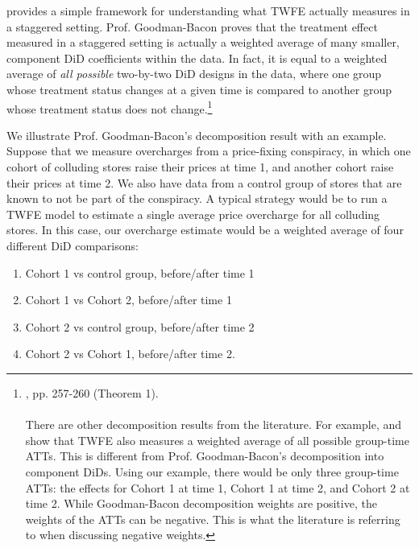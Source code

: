 \documentclass[12pt]{article}
\begin{document}
\citet{goodman-bacon2021a} provides a simple framework for understanding what TWFE actually measures in a staggered setting. Prof. Goodman-Bacon proves that the treatment effect measured in a staggered setting is actually a weighted average of many smaller, component DiD coefficients within the data. In fact, it is equal to a weighted average of \textit{all possible} two-by-two DiD designs in the data, where one group whose treatment status changes at a given time is compared to another group whose treatment status does not change.\footnote{\citet{goodman-bacon2021a}, pp. 257-260 (Theorem 1).
\\\\
There are other decomposition results from the literature. For example, \citet{de2020two} and \citet{borusyak2024revisiting} show that TWFE also measures a weighted average of all possible group-time ATTs. This is different from Prof. Goodman-Bacon's decomposition into component DiDs. Using our example, there would be only three group-time ATTs: the effects for Cohort 1 at time 1, Cohort 1 at time 2, and Cohort 2 at time 2. While Goodman-Bacon decomposition weights are positive, the weights of the ATTs can be negative. This is what the literature is referring to when discussing negative weights. 
}

We illustrate Prof. Goodman-Bacon's decomposition result with an example. Suppose that we measure overcharges from a price-fixing conspiracy, in which one cohort of colluding stores raise their prices at time 1, and another cohort raise their prices at time 2. We also have data from a control group of stores that are known to not be part of the conspiracy. A typical strategy would be to run a TWFE model to estimate a single average price overcharge for all colluding stores. In this case, our overcharge estimate would be a weighted average of four different DiD comparisons:
\begin{enumerate}
    \item Cohort 1 vs control group, before/after time 1
    \item Cohort 1 vs Cohort 2, before/after time 1
    \item Cohort 2 vs control group, before/after time 2
    \item Cohort 2 vs Cohort 1, before/after time 2.
\end{enumerate}
\end{document}
